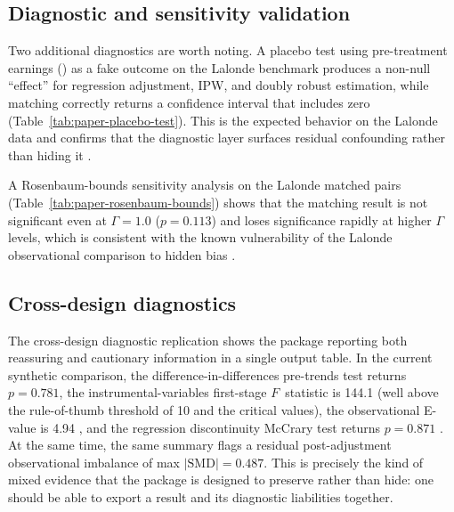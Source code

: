 \documentclass[article]{jss}
\begin{document}
\subsection{Diagnostic and sensitivity validation}\label{sec:diag-val}

Two additional diagnostics are worth noting. A placebo test using
pre-treatment earnings () as a fake outcome on the Lalonde
benchmark produces a non-null ``effect'' for regression adjustment, IPW,
and doubly robust estimation, while matching correctly returns a confidence
interval that includes zero (Table~\ref{tab:paper-placebo-test}). This is
the expected behavior on the Lalonde data and confirms that the diagnostic
layer surfaces residual confounding rather than hiding it
\citep{DehejiaWahba1999,Stuart2010}.



A Rosenbaum-bounds sensitivity analysis on the Lalonde matched pairs
(Table~\ref{tab:paper-rosenbaum-bounds}) shows that the matching
result is not significant even at $\Gamma = 1.0$ ($p = 0.113$) and loses
significance rapidly at higher $\Gamma$ levels, which is consistent with
the known vulnerability of the Lalonde observational comparison to hidden
bias \citep{Rosenbaum2002}.



\subsection{Cross-design diagnostics}\label{sec:cross-design}

The cross-design diagnostic replication shows the package reporting both
reassuring and cautionary information in a single output
table. In the current synthetic comparison, the difference-in-differences
pre-trends test returns $p = 0.781$, the instrumental-variables first-stage
$F$~statistic is 144.1 (well above the \citet{StaigerStock1997}
rule-of-thumb threshold of 10 and the \citet{StockYogo2005} critical
values), the observational E-value is 4.94 \citep{VanderWeeleDing2017},
and the regression discontinuity McCrary test returns $p = 0.871$
\citep{McCrary2008,CattaneoJanssonMa2020}. At the same time, the same
summary flags a residual post-adjustment observational imbalance of
max $|\mathrm{SMD}| = 0.487$. This is precisely the kind of mixed evidence
that the package is designed to preserve rather than hide: one should be
able to export a result and its diagnostic liabilities together.
\end{document}
